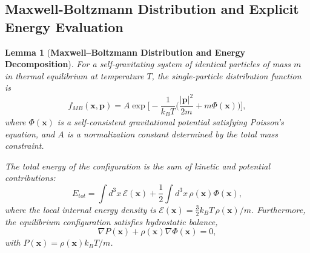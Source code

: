 \documentclass[12pt,a4paper]{article}
\newtheorem{lem}[thm]{Lemma}
\numberwithin{equation}{section}
\begin{document}
\subsection{Maxwell-Boltzmann Distribution and Explicit Energy Evaluation}

\begin{lem}[\textbf{Maxwell–Boltzmann Distribution and Energy Decomposition}]
For a self-gravitating system of identical particles of mass \(m\) in thermal equilibrium at temperature \(T\),
the single-particle distribution function is
\begin{equation}
f_{MB}(\mathbf{x}, \mathbf{p})
= A \exp\!\Bigg[-\frac{1}{k_B T} \Big(\frac{|\mathbf{p}|^2}{2m} + m \Phi(\mathbf{x})\Big)\Bigg],
\end{equation}
where \(\Phi(\mathbf{x})\) is a self-consistent gravitational potential satisfying Poisson’s equation,
and \(A\) is a normalization constant determined by the total mass constraint.

The total energy of the configuration is the sum of kinetic and potential contributions:
\begin{equation}
E_{tot} = \int d^3x \, \mathcal{E}(\mathbf{x}) + \frac{1}{2} \int d^3x \, \rho(\mathbf{x}) \Phi(\mathbf{x}),
\end{equation}
where the local internal energy density is \(\mathcal{E}(\mathbf{x}) = \tfrac{3}{2} k_B T \, \rho(\mathbf{x})/m\).
Furthermore, the equilibrium configuration satisfies hydrostatic balance,
\begin{equation}
\nabla P(\mathbf{x}) + \rho(\mathbf{x}) \nabla \Phi(\mathbf{x}) = 0,
\end{equation}
with \(P(\mathbf{x}) = \rho(\mathbf{x}) k_B T / m\).
\end{lem}
\end{document}
